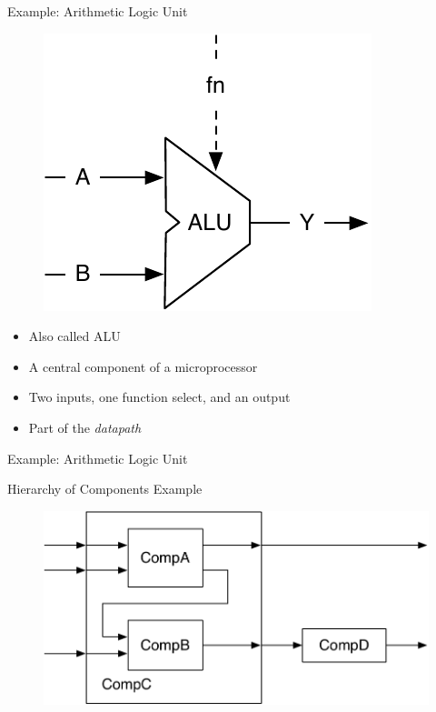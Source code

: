 \begin{frame}[fragile]{Example: Arithmetic Logic Unit}
\begin{figure}
  \includegraphics[scale=\scale]{../figures/alu}
\end{figure}
\begin{itemize}
\item Also called ALU
\item A central component of a microprocessor
\item Two inputs, one function select, and an output
\item Part of the \emph{datapath}
\end{itemize}
\end{frame}

\begin{frame}[fragile]{Example: Arithmetic Logic Unit}
\end{frame}

\begin{frame}[fragile]{Hierarchy of Components Example}
\begin{figure}
  \includegraphics[scale=\scale]{../figures/components}
\end{figure}
\end{frame}


